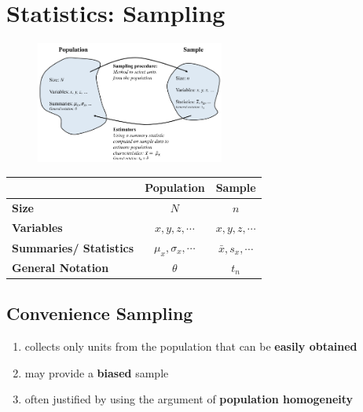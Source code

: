 \chapter{Statistics: Sampling}\label{Statistics: Sampling}

\begin{figure}[h]
    \centering
    \includegraphics[width=\linewidth, height=4cm, keepaspectratio]{Pictures/statistics/population-and-sample.png}
\end{figure}

\begin{table}[h]
    \centering
    \begin{tabular}{|l|c|c|}
        \hline

        & \textbf{Population} & \textbf{Sample}\\
        \hline

        \textbf{Size} & $N$ & $n$ \\
        \hline

        \textbf{Variables} & $x,y,z,\cdots$ & $x,y,z,\cdots$ \\
        \hline

        \textbf{Summaries/ Statistics} & $\mu_x,\sigma_x,\cdots$ & $\bar{x}, s_x, \cdots$\\
        \hline

        \textbf{General Notation} & $\theta$ & $t_n$\\
        \hline
    \end{tabular}
\end{table}


\section{Convenience Sampling \cite{ism-1}} \label{Convenience Sampling}

\begin{enumerate}
    \item collects only units from the population that can be \textbf{easily obtained}

    \item may provide a \textbf{biased} sample

    \item often justified by using the argument of \textbf{population homogeneity}
\end{enumerate}

